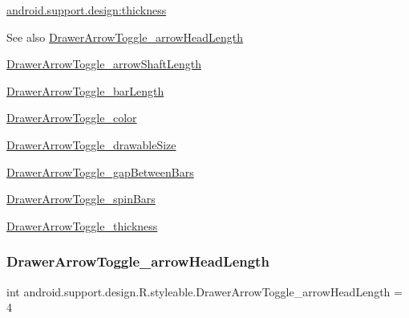 {\ttfamily \hyperlink{classandroid_1_1support_1_1design_1_1R_1_1styleable_af90c46759c926f94b975e2379b862526}{android.\+support.\+design\+:thickness}}

\begin{DoxySeeAlso}{See also}
\hyperlink{classandroid_1_1support_1_1design_1_1R_1_1styleable_a04d4c9dc68578489d0d401c435684cfb}{Drawer\+Arrow\+Toggle\+\_\+arrow\+Head\+Length} 

\hyperlink{classandroid_1_1support_1_1design_1_1R_1_1styleable_a2dca38b895260aa31773fd2f7f247438}{Drawer\+Arrow\+Toggle\+\_\+arrow\+Shaft\+Length} 

\hyperlink{classandroid_1_1support_1_1design_1_1R_1_1styleable_ae52627e17694eb02d691f0e5d355fb74}{Drawer\+Arrow\+Toggle\+\_\+bar\+Length} 

\hyperlink{classandroid_1_1support_1_1design_1_1R_1_1styleable_a95f1e87753ba4cd62fef03f1b2635ba1}{Drawer\+Arrow\+Toggle\+\_\+color} 

\hyperlink{classandroid_1_1support_1_1design_1_1R_1_1styleable_aa82a02d1c0ba82c43692ec349fddcea0}{Drawer\+Arrow\+Toggle\+\_\+drawable\+Size} 

\hyperlink{classandroid_1_1support_1_1design_1_1R_1_1styleable_aa48d199f2cd1185a5c6a23528050d749}{Drawer\+Arrow\+Toggle\+\_\+gap\+Between\+Bars} 

\hyperlink{classandroid_1_1support_1_1design_1_1R_1_1styleable_a927e817de79212ffbefd47a7d4fb1a1e}{Drawer\+Arrow\+Toggle\+\_\+spin\+Bars} 

\hyperlink{classandroid_1_1support_1_1design_1_1R_1_1styleable_af90c46759c926f94b975e2379b862526}{Drawer\+Arrow\+Toggle\+\_\+thickness} 
\end{DoxySeeAlso}
\mbox{\label{classandroid_1_1support_1_1design_1_1R_1_1styleable_a04d4c9dc68578489d0d401c435684cfb}} 
\subsubsection{\texorpdfstring{Drawer\+Arrow\+Toggle\+\_\+arrow\+Head\+Length}{DrawerArrowToggle\_arrowHeadLength}}
{\footnotesize\ttfamily int android.\+support.\+design.\+R.\+styleable.\+Drawer\+Arrow\+Toggle\+\_\+arrow\+Head\+Length = 4\hspace{0.3cm}{\ttfamily [static]}}

